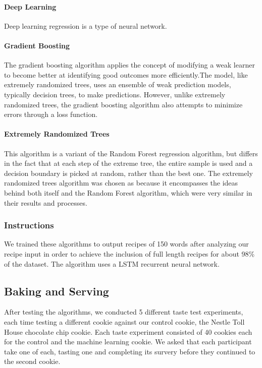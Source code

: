 \documentclass[11pt, a4paper]{article}
\begin{document}
		\paragraph{Deep Learning}
		Deep learning regression is a type of neural network.
		\paragraph{Gradient Boosting}
		The gradient boosting algorithm applies the concept of modifying a weak learner to become better at identifying good outcomes more efficiently.The model, like extremely randomized trees, uses an ensemble of weak prediction models, typically decision trees, to make predictions. However, unlike extremely randomized trees, the gradient boosting algorithm also attempts to minimize errors through a loss function.
		\paragraph{Extremely Randomized Trees}
		This algorithm is a variant of the Random Forest regression algorithm, but differs in the fact that at each step of the extreme tree, the entire sample is used and a decision boundary is picked at random, rather than the best one.
		The extremely randomized trees algorithm was chosen as because it encompasses the ideas behind both itself and the Random Forest algorithm, which were very similar in their results and processes.
		\subsubsection{Instructions}
		We trained these algorithms to output recipes of 150 words after analyzing our recipe input in order to achieve the inclusion of full length recipes for about 98\% of the dataset. The algorithm uses a LSTM recurrent neural network. 
		\subsection{Baking and Serving}
		After testing the algorithms, we conducted 5 different taste test experiments, each time testing a different cookie against our control cookie, the Nestle\textsuperscript{\textregistered} Toll House\textsuperscript{\textregistered} chocolate chip cookie. Each taste experiment consisted of 40 cookies each for the control and the machine learning cookie. We asked that each participant take one of each, tasting one and completing its survery before they continued to the second cookie.
\end{document}
